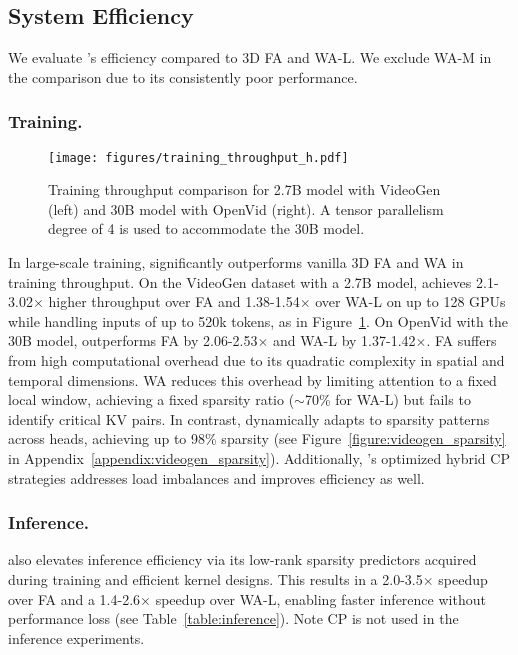 \subsection{System Efficiency}
\label{sec:efficiency}
We evaluate \sys's efficiency compared to 3D FA and WA-L. We exclude WA-M in the comparison due to its consistently poor performance. 

\subsubsection{Training.} 

\begin{figure}[t]
  \centering
  \texttt{[image: figures/training\_throughput\_h.pdf]} 
\caption{Training throughput comparison for 2.7B model with VideoGen (left) and 30B model with OpenVid (right). A tensor parallelism degree of 4 is used to accommodate the 30B model.}
  \label{fig:training_throughput} 
\end{figure}

In large-scale training, \sys significantly outperforms vanilla 3D FA and WA in training throughput. 
On the VideoGen dataset with a 2.7B model, \sys achieves 2.1-3.02$\times$ higher throughput over FA and 1.38-1.54$\times$ over WA-L on up to 128 GPUs while handling inputs of up to 520k tokens, as in Figure~\ref{fig:training_throughput}. 
On OpenVid with the 30B model, \sys outperforms FA by 2.06-2.53$\times$ and WA-L by 1.37-1.42$\times$.
FA suffers from high computational overhead due to its quadratic complexity in spatial and temporal dimensions. WA reduces this overhead by limiting attention to a fixed local window, achieving a fixed sparsity ratio ($\sim$70\% for WA-L) but fails to identify critical KV pairs. In contrast, \sys dynamically adapts to sparsity patterns across heads, achieving up to 98\% sparsity (see Figure~\ref{figure:videogen_sparsity} in Appendix~\ref{appendix:videogen_sparsity}). Additionally, \sys's optimized hybrid CP strategies addresses load imbalances and improves efficiency as well.

\subsubsection{Inference.} \sys also elevates inference efficiency via its low-rank sparsity predictors acquired during training and efficient kernel designs. 
This results in a 2.0-3.5$\times$ speedup over FA and a 1.4-2.6$\times$ speedup over WA-L, enabling faster inference without performance loss (see Table~\ref{table:inference}). Note CP is not used in the inference experiments.







